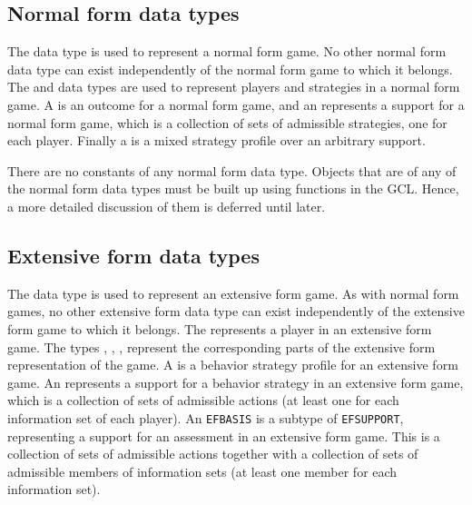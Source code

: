\subsection{Normal form data types}

The data type  is used to represent a normal form game.  No
other normal form data type can exist independently of the normal form
game to which it belongs.  The  and 
data types are used to represent players and strategies in a normal
form game.  A  is an outcome for a normal form game,
and an  represents a support for a normal form
game, which is a collection of sets of admissible strategies, one for
each player.  Finally a  is a mixed strategy profile over
an arbitrary support.

There are no constants of any normal form data type.  Objects that are
of any of the normal form data types must be built up using functions
in the GCL.  Hence, a more detailed discussion of them is deferred
until later.  

\subsection{Extensive form data types}
The data type  is used to represent an extensive form
game.  As with normal form games, no other extensive form data type
can exist independently of the extensive form game to which it
belongs.  The  represents a player in an extensive
form game.  The types , ,
,  represent the corresponding parts
of the extensive form representation of the game.  A  is
a behavior strategy profile 
for an extensive form game. 
An  represents a
support for a behavior strategy in an extensive form game, which is a
collection of sets of admissible actions (at least one for each
information set of each player).  An \verb+EFBASIS+ is a subtype of
\verb+EFSUPPORT+, representing a support for an assessment in an
extensive form game. This is a collection of sets of admissible
actions together with a collection of sets of admissible members of
information sets (at least one member for each information set).

